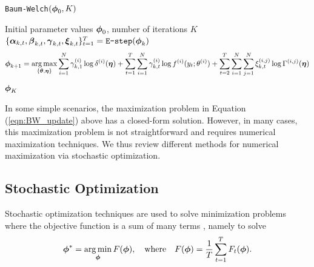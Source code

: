 %
%
%
\begin{algorithm}
\caption{\texttt{Baum-Welch}$(\boldsymbol{\phi}_0,K)$}\label{alg:EM}
\begin{algorithmic}[1]
\Require Initial parameter values $\boldsymbol{\phi}_0$, number of iterations $K$
    \State $\{\boldsymbol{\alpha}_{k,t},\boldsymbol{\beta}_{k,t},\boldsymbol{\gamma}_{k,t},\boldsymbol{\xi}_{k,t}\}_{t=1}^T = \texttt{E-step}(\boldsymbol{\phi}_{k})$  
    \State {} $$\boldsymbol{\phi}_{k+1} = \operatorname*{arg\,max}_{\{\boldsymbol{\theta},\boldsymbol{\eta}\}} \sum_{i=1}^N \gamma^{(i)}_{k,1} \log \delta^{(i)}(\boldsymbol{\eta}) + \sum_{t = 1}^T \sum_{i=1}^N \gamma^{(i)}_{k,t} \log f^{(i)}(y_t;\theta^{(i)}) + \sum_{t=2}^{T} \sum_{i=1}^N \sum_{j=1}^N \xi_{k,t}^{(i,j)} \log \Gamma^{(i,j)}(\boldsymbol{\eta})$$
\EndFor
\State \Return $\boldsymbol{\phi}_K$
\end{algorithmic}
\end{algorithm}
%
In some simple scenarios, the maximization problem in Equation (\ref{eqn:BW_update}) above has a closed-form solution. %
However, in many cases, this maximization problem is not straightforward and requires numerical maximization techniques. %
We thus review different methods for numerical maximization via stochastic optimization. %

\subsection{Stochastic Optimization}
\label{subsec:stoch_optim}

Stochastic optimization techniques are used to solve minimization problems where the objective function is a sum of many terms \citep{Robbins:1951}, %
namely to solve
%
\begin{equation}
    \boldsymbol{\phi}^* = \operatorname*{arg\,min}_{\boldsymbol{\phi}} F(\boldsymbol{\phi}), \quad \text{where} \quad F(\boldsymbol{\phi}) = \frac{1}{T}\sum_{t = 1}^T F_t(\boldsymbol{\phi}).
    \label{eqn:stoch_opt}
\end{equation}
%

